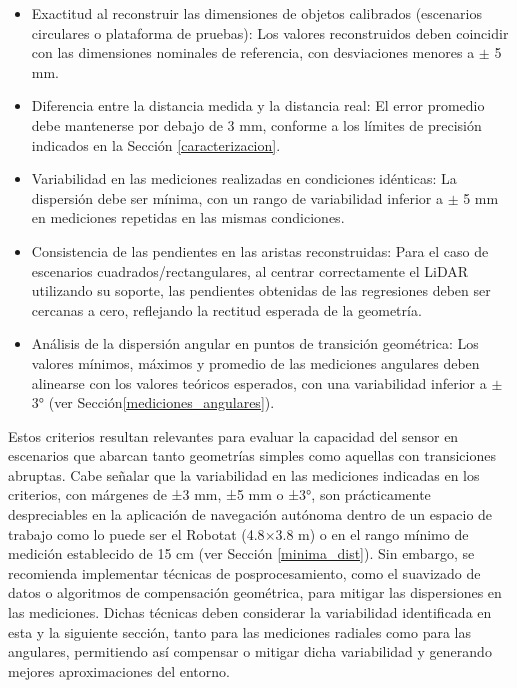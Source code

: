 \begin{itemize}
	\item Exactitud al reconstruir las dimensiones de objetos calibrados (escenarios circulares o plataforma de pruebas): Los valores reconstruidos deben coincidir con las dimensiones nominales de referencia, con desviaciones menores a $\pm$ 5 mm.
	\item Diferencia entre la distancia medida y la distancia real: El error promedio debe mantenerse por debajo de 3 mm, conforme a los límites de precisión indicados en la Sección \ref{caracterizacion}.
	\item Variabilidad en las mediciones realizadas en condiciones idénticas: La dispersión debe ser mínima, con un rango de variabilidad inferior a $\pm$ 5 mm en mediciones repetidas en las mismas condiciones.
	\item Consistencia de las pendientes en las aristas reconstruidas: Para el caso de escenarios cuadrados/rectangulares, al centrar correctamente el LiDAR utilizando su soporte, las pendientes obtenidas de las regresiones deben ser cercanas a cero, reflejando la rectitud esperada de la geometría.
	\item Análisis de la dispersión angular en puntos de transición geométrica: Los valores mínimos, máximos y promedio de las mediciones angulares deben alinearse con los valores teóricos esperados, con una variabilidad inferior a $\pm$ 3° (ver Sección\ref{mediciones_angulares}).
\end{itemize}

Estos criterios resultan relevantes para evaluar la capacidad del sensor en escenarios que abarcan tanto geometrías simples como aquellas con transiciones abruptas. Cabe señalar que la variabilidad en las mediciones indicadas en los criterios, con márgenes de ±3 mm, ±5 mm o ±3°, son prácticamente despreciables en la aplicación de navegación autónoma dentro de un espacio de trabajo como lo puede ser el Robotat (4.8$\times$3.8 m) o en el rango mínimo de medición establecido de 15 cm (ver Sección \ref{minima_dist}). Sin embargo, se recomienda implementar técnicas de posprocesamiento, como el suavizado de datos o algoritmos de compensación geométrica, para mitigar las dispersiones en las mediciones. Dichas técnicas deben considerar la variabilidad identificada en esta y la siguiente sección, tanto para las mediciones radiales como para las angulares, permitiendo así compensar o mitigar dicha variabilidad y generando mejores aproximaciones del entorno.

